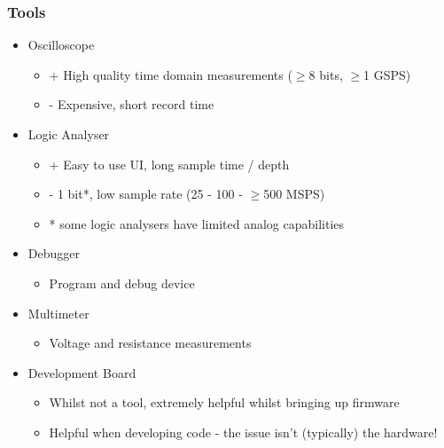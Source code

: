 \documentclass[t]{beamer}
\begin{document}

\begin{frame}[t]
\frametitle{Tools}
\begin{itemize}
	\item Oscilloscope
	\begin{itemize}
		\item + High quality time domain measurements ($\ge$8 bits, $\ge$1 GSPS)
		\item - Expensive, short record time
	\end{itemize} 	
	\item Logic Analyser
	\begin{itemize}
		\item + Easy to use UI, long sample time / depth 
		\item - 1 bit*, low sample rate (25 - 100 - $\ge$500 MSPS)
		\item * some logic analysers have limited analog capabilities 
	\end{itemize} 
	\item Debugger
	\begin{itemize}
		\item Program and debug device
	\end{itemize} 
	\item Multimeter
	\begin{itemize}
		\item Voltage and resistance measurements
	\end{itemize} 
	\item Development Board
	\begin{itemize}
		\item Whilst not a tool, extremely helpful whilst bringing up firmware
		\item Helpful when developing code - the issue isn't (typically) the hardware!
	\end{itemize} 
\end{itemize} 
\end{frame}

\end{document}
